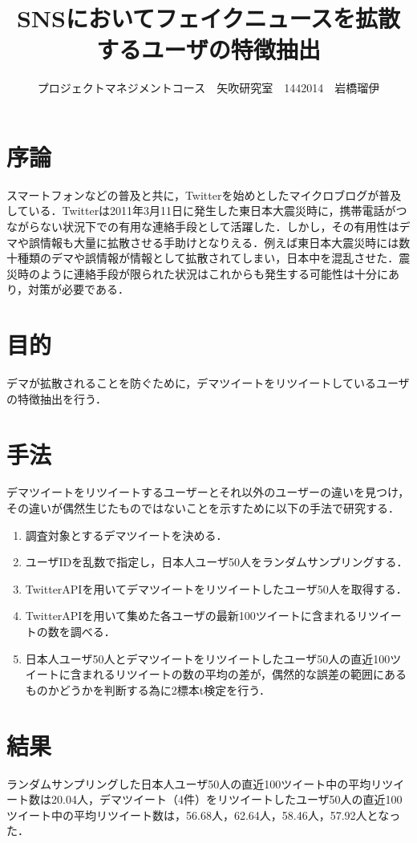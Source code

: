 \documentclass[uplatex,twocolumn,dvipdfmx]{jsarticle}
\title{\vspace{-5mm}\fontsize{14pt}{0pt}\selectfont SNSにおいてフェイクニュースを拡散するユーザの特徴抽出}
\author{\normalsize プロジェクトマネジメントコース　矢吹研究室　1442014　岩橋瑠伊}
\date{}
\begin{document}
\fontsize{10.5pt}{\baselineskip}\selectfont
\maketitle





\section{序論}
スマートフォンなどの普及と共に，Twitterを始めとしたマイクロブログが普及している．Twitterは2011年3月11日に発生した東日本大震災時に，携帯電話がつながらない状況下での有用な連絡手段として活躍した．しかし，その有用性はデマや誤情報も大量に拡散させる手助けとなりえる．例えば東日本大震災時には数十種類のデマや誤情報が情報として拡散されてしまい，日本中を混乱させた．震災時のように連絡手段が限られた状況はこれからも発生する可能性は十分にあり，対策が必要である\cite{dema1}．

\section{目的}
デマが拡散されることを防ぐために，デマツイートをリツイートしているユーザの特徴抽出を行う．

\section{手法}
デマツイートをリツイートするユーザーとそれ以外のユーザーの違いを見つけ，その違いが偶然生じたものではないことを示すために以下の手法で研究する．
\begin{enumerate}
\item 調査対象とするデマツイートを決める．
\item ユーザIDを乱数で指定し，日本人ユーザ50人をランダムサンプリングする．
\item TwitterAPIを用いてデマツイートをリツイートしたユーザ50人を取得する．
\item TwitterAPIを用いて集めた各ユーザの最新100ツイートに含まれるリツイートの数を調べる．
\item 日本人ユーザ50人とデマツイートをリツイートしたユーザ50人の直近100ツイートに含まれるリツイートの数の平均の差が，偶然的な誤差の範囲にあるものかどうかを判断する為に2標本t検定を行う．
\end{enumerate}

\section{結果}
ランダムサンプリングした日本人ユーザ50人の直近100ツイート中の平均リツイート数は20.04人，デマツイート（4件）をリツイートしたユーザ50人の直近100ツイート中の平均リツイート数は，56.68人，62.64人，58.46人，57.92人となった．
\end{document}
